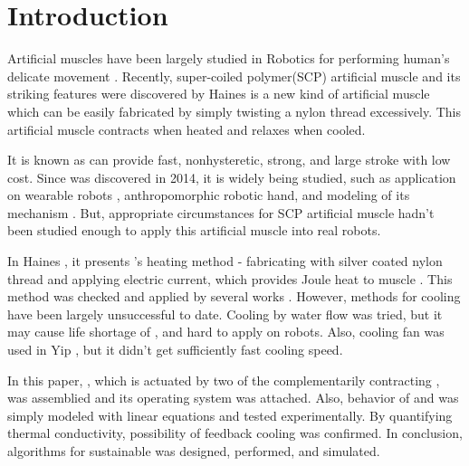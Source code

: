 
\section{Introduction}
Artificial muscles have been largely studied in Robotics for performing human's delicate movement \cite{ashley}. Recently, super-coiled polymer(SCP) artificial muscle and its striking features were discovered by Haines \etal \cite{haines} \scp is a new kind of artificial muscle which can be easily fabricated by simply twisting a nylon thread excessively. This artificial muscle contracts when heated and relaxes when cooled.

It is known as \scp can provide fast, nonhysteretic, strong, and large stroke with low cost\cite{yuan, mirvakili, madden}. 
Since \scp was discovered in 2014, it is widely being studied, such as application on
wearable robots \cite{sphincter, kianzad2}, 
anthropomorphic robotic hand\cite{yip, finger}, 
and modeling of its mechanism \cite{treatise, torsional, youngmodulus, fab_coil, multiscale, healing, kianzad, moretti}. 
But, appropriate circumstances for SCP artificial muscle%
hadn't been studied enough to apply this artificial muscle into real robots.

In Haines \etal, it presents \scp 's heating method - fabricating \scp with silver coated nylon thread and applying electric current, which provides Joule heat to muscle \cite{haines}. This method was checked and applied by several works \cite{yip, mirvakili,kianzad,sphincter,kianzad2}. However, methods for cooling \scp have been largely unsuccessful to date. 
Cooling by water flow was tried\cite{haines,finger}, but it may cause life shortage of \scp \cite{haines}, and hard to apply on robots. Also, cooling fan was used in Yip \etal, but it didn't get sufficiently fast cooling speed.

In this paper, \antanospace, which is actuated by two of the complementarily contracting \scpnospace, was assemblied and its operating system was attached. Also, behavior of \scp and \anta was simply modeled with linear equations and tested experimentally. By quantifying thermal conductivity, possibility of feedback cooling was confirmed. In conclusion, algorithms for sustainable \apc was designed, performed, and simulated.